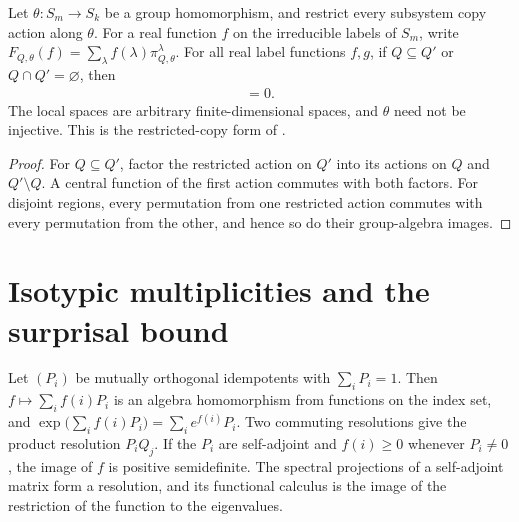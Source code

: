 \begin{theorem}
    \label{thm:subgroup_subsystem_label_commutation}
    \leanok
    Let $\theta:S_m\to S_k$ be a group homomorphism, and restrict every
    subsystem copy action along $\theta$. For a real function $f$ on the
    irreducible labels of $S_m$, write
    $F_{Q,\theta}(f)=\sum_\lambda f(\lambda)\pi^\lambda_{Q,\theta}$.
    For all real label functions $f,g$, if $Q\subseteq Q'$ or
    $Q\cap Q'=\varnothing$, then
    \begin{align}
       [F_{Q,\theta}(f),F_{Q',\theta}(g)]=0.
    \end{align}
    The local spaces are arbitrary
    finite-dimensional spaces, and $\theta$ need not be injective.
    This is the restricted-copy form of
    \cite[Lemma 6.1(2), Section 8]{OpenAI2026AreaLaw}.
\end{theorem}

\begin{proof}
    \leanok
    For $Q\subseteq Q'$, factor the restricted action on $Q'$ into its
    actions on $Q$ and $Q'\setminus Q$. A central function of the first
    action commutes with both factors. For disjoint regions, every
    permutation from one restricted action commutes with every
    permutation from the other, and hence so do their group-algebra images.
\end{proof}

\section{Isotypic multiplicities and the surprisal bound}

\begin{lemma}
    \label{lem:orthogonal_resolution}
    \leanok
    Let $(P_i)$ be mutually orthogonal idempotents with $\sum_iP_i=1$. Then
    $f\mapsto\sum_if(i)P_i$ is an algebra homomorphism from functions on the
    index set, and $\exp\bigl(\sum_if(i)P_i\bigr)=\sum_ie^{f(i)}P_i$. Two
    commuting resolutions give the product resolution $P_iQ_j$. If the $P_i$
    are self-adjoint and $f(i)\ge0$ whenever $P_i\ne0$, the image of $f$ is
    positive semidefinite. The spectral projections of a self-adjoint matrix
    form a resolution, and its functional calculus is the image of the
    restriction of the function to the eigenvalues.
\end{lemma}

